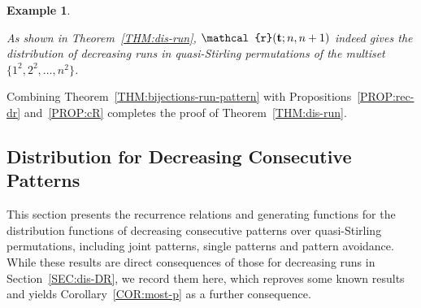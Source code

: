 \documentclass[11pt]{article}
\newcommand{\vt} { {\bf t}}
\numberwithin{equation}{section}
\newtheorem{exa}[thm]{Example}
\newcommand{\ccr}{\mathcal{r}}
\begin{document}
\begin{exa}
\begin{enumerate}
		As shown in Theorem~\ref{THM:dis-run}, $\ccr(\vt;n,n+1)$ indeed gives the distribution of decreasing runs in quasi-Stirling permutations of the multiset $\{1^2,2^2,\ldots,n^2\}$.
	\end{enumerate}
\end{exa}

Combining Theorem~\ref{THM:bijections-run-pattern} with Propositions~\ref{PROP:rec-dr} and~\ref{PROP:cR} completes the proof of Theorem~\ref{THM:dis-run}.



\subsection{Distribution for Decreasing Consecutive Patterns}\label{SEC:dis-p}


This section presents the recurrence relations and generating functions for the distribution functions of decreasing consecutive patterns over quasi-Stirling permutations, including joint patterns, single patterns and pattern avoidance. While these results are direct consequences of those for decreasing runs in Section~\ref{SEC:dis-DR}, we record them here, which reproves some known results and yields Corollary~\ref{COR:most-p} as a further consequence.
\end{document}
